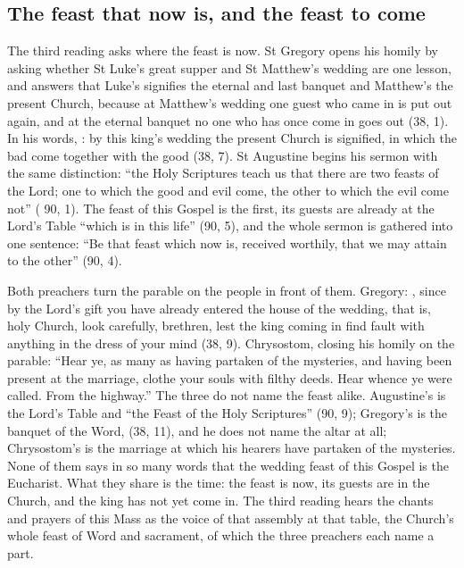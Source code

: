 \subsection{The feast that now is, and the feast to come}

The third reading asks where the feast is now. St Gregory opens his homily by
asking whether St Luke's great supper and St Matthew's wedding are one lesson,
and answers that Luke's signifies the eternal and last banquet and Matthew's
the present Church, because at Matthew's wedding one guest who came in is put
out again, and at the eternal banquet no one who has once come in goes out
(38, 1). In his words, : by this king's wedding the present Church is
signified, in which the bad come together with the good (38, 7). St Augustine
begins his sermon with the same distinction: ``the Holy Scriptures teach us that
there are two feasts of the Lord; one to which the good and evil come, the other
to which the evil come not'' ( 90, 1). The feast of this Gospel is
the first, its guests are already at the Lord's Table ``which is in this life''
(90, 5), and the whole sermon is gathered into one sentence: ``Be that feast
which now is, received worthily, that we may attain to the other'' (90, 4).

Both preachers turn the parable on the people in front of them. Gregory:
, since by the Lord's gift you have already entered the
house of the wedding, that is, holy Church, look carefully, brethren, lest the
king coming in find fault with anything in the dress of your mind (38, 9).
Chrysostom, closing his homily on the parable: ``Hear ye, as many as having
partaken of the mysteries, and having been present at the marriage, clothe your
souls with filthy deeds. Hear whence ye were called. From the highway.'' The
three do not name the feast alike. Augustine's is the Lord's Table and ``the
Feast of the Holy Scriptures'' (90, 9); Gregory's is the banquet of the Word,
 (38, 11), and he does not name the
altar at all; Chrysostom's is the marriage at which his hearers have partaken of
the mysteries. None of them says in so many words that the wedding feast of
this Gospel is the Eucharist. What they share is the time: the feast is now, its
guests are in the Church, and the king has not yet come in. The third reading
hears the chants and prayers of this Mass as the voice of that assembly at that
table, the Church's whole feast of Word and sacrament, of which the three
preachers each name a part.

